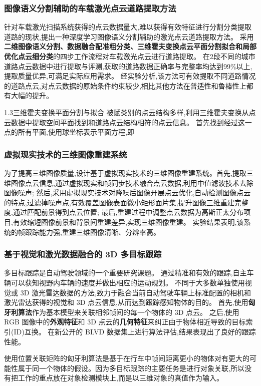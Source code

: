 \documentclass{amsart}
\begin{document}
\subsubsection{图像语义分割辅助的车载激光点云道路提取方法}
\cite{于博}针对车载激光扫描系统获得的点云数据量大,难以获得有效特征进行分割分类提取道路的现状,提出一种深度学习图像语义分割辅助的激光点云道路提取方法。
采用\textbf{二维图像语义分割、数据融合配准粗分类、三维霍夫变换点云平面分割拟合和局部优化点云细分类}的四步工作流程对车载激光点云进行道路提取。
在2段不同的城市道路点云数据中进行提取与评测,获取的道路数据正确率与完整率均达到99\%以上,提取质量优异,可满足实际应用需求。
经实验分析,该方法可有效提取不同道路情况的道路点云,对点云数据的原始条件约束较少,相比其他方法在普适性和鲁棒性上都有大幅的提升。

1.3三维霍夫变换平面分割与拟合
被赋类别的点云结构多样,利用三维霍夫变换从点云数据中提取空间平面找到和道路点云结构相符的点云信息。
首先找到经过这一点的所有平面,使用球坐标表示平面方程,即


\subsubsection{虚拟现实技术的三维图像重建系统}
为了提高三维图像质量,设计基于虚拟现实技术的三维图像重建系统。首先,提取三维图像点云信息,通过虚拟现实和帧同步技术融合点云数据,利用中值滤波技术去除图像噪声;
然后,采用虚拟现实技术对降噪后图像开展点云优化,自动检测图像点云的特点,过滤掉噪声点,有效覆盖图像表面微小矩形面片集,提升图像三维重建完整度,通过匹配前景得到点云位置;
最后,重建过程中调整点云数据为高斯正太分布项目,有效缩短图像前景和背景间重建差异,实现三维图像重建。
实验结果表明,该系统的帧跟踪能力强,重建三维图像清晰、分辨率高。

\subsubsection{基于视觉和激光数据融合的 3D 多目标跟踪}
多目标跟踪是自动驾驶领域的一个重要研究课题。
通过精准和有效的跟踪,自主车辆可以获知视野内车辆的速度并做出相应的运动规划。
不同于大多数单独使用视觉或 3D 激光雷达数据的方法,致力于融合当前自动驾驶车辆上标准配置的相机和激光雷达获得的视觉和 3D 点云信息,从而达到跟踪感知物体的目的。
首先,使用\textbf{匈牙利算法}作为基本模型来关联相邻帧间的每一个物体的 3D 点云。
之后,使用 RGB 图像中的\textbf{外观特征}和 3D 点云的\textbf{几何特征}来纠正由于物体相近导致的目标索引(ID)互换。
在新公开的 BLVD 数据集上进行算法评估,结果表现出了良好的跟踪性能。


使用位置关联矩阵的匈牙利算法是基于在行车中帧间距离更小的物体对有更大的可能性属于同一个物体的假设。因为多目标跟踪的主要任务是进行对象关联,所以没有把工作的重点放在对象检测模块上,而是以三维对象的真值作为输入。
\subsubsection{}
\end{document}
